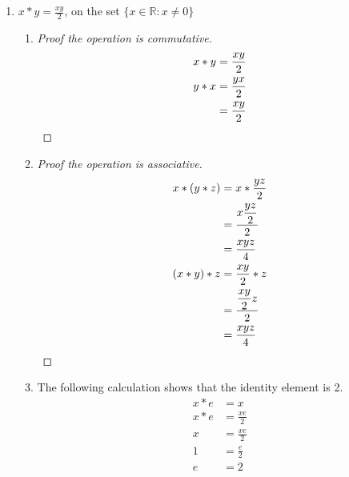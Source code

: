 \documentclass[twoside]{amsart}
\newcommand{\Reals}{\mathbb{R}{}}
\begin{document}
\begin{enumerate}[A.]
\begin{enumerate}[1.]
\begin{enumerate}
	 We know by commuativity that $x * (-k) = (-k) * x$. Therefore,
	 $-k$ is the identity element.

	 \item We can caluclate the inverse of $x$ which we label $x'$.
	 \begin{align*}
	    x * x' & = -k          \\
	    x * x' & = x + x' + k  \\
	       -k  & = x + x' + k  \\
		x' & = -x - 2k
	 \end{align*}

      \end{enumerate}

      \item $\displaystyle x * y = \frac{xy}{2}$, on the set $\{x \in \Reals
      : x \ne 0\}$
      
	 \begin{enumerate}
	    \item
	    \begin{proof}[Proof the operation is commutative]
	       \begin{align*}
		  x * y & = \frac{xy}{2}         \\
		  y * x & = \frac{yx}{2}         \\
			& = \frac{xy}{2} \qedhere
	       \end{align*}
	    \end{proof}

	    \item
	    \begin{proof}[Proof the operation is associative]
	       \begin{align*}
		  x * (y * z) & = x * \frac{yz}{2}   \\
			      & = \frac{x\displaystyle\frac{yz}{2}}{2} \\
			      & = \frac{xyz}{4} \\
		  (x * y) * z & = \frac{xy}{2} * z \\
			      & = \frac{\displaystyle \frac{xy}{2}z}{2} \\
			      & = \frac{xyz}{4} \qedhere
	       \end{align*}
	    \end{proof}

	    \item The following calculation shows that the identity element
	    is 2.
	    \begin{align*}
	       x * e & = x              \\
	       x * e & = \frac{xe}{2}   \\
		   x & = \frac{xe}{2}   \\
		   1 & = \frac{e}{2}    \\
		   e & = 2
	    \end{align*}


\end{enumerate}
\end{enumerate}
\end{enumerate}
\end{document}
